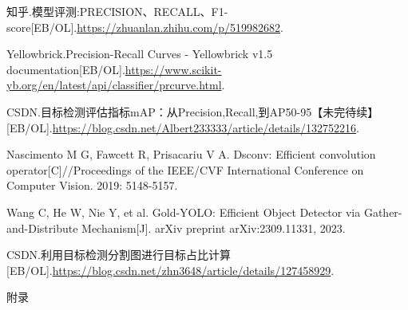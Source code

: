 \documentclass{MathorCupmodeling}
\begin{document}
\begin{spacing}{1.08}
\begin{thebibliography}{99}
	知乎.模型评测:PRECISION、RECALL、F1-score[EB/OL].\url{https://zhuanlan.zhihu.com/p/519982682}.

	Yellowbrick.Precision-Recall Curves - Yellowbrick v1.5 documentation[EB/OL].\url{https://www.scikit-yb.org/en/latest/api/classifier/prcurve.html}.

	CSDN.目标检测评估指标mAP：从Precision,Recall,到AP50-95【未完待续】[EB/OL].\url{https://blog.csdn.net/Albert233333/article/details/132752216}.

	Nascimento M G, Fawcett R, Prisacariu V A. Dsconv: Efficient convolution operator[C]//Proceedings of the IEEE/CVF International Conference on Computer Vision. 2019: 5148-5157.

	Wang C, He W, Nie Y, et al. Gold-YOLO: Efficient Object Detector via Gather-and-Distribute Mechanism[J]. arXiv preprint arXiv:2309.11331, 2023.

	CSDN.利用目标检测分割图进行目标占比计算[EB/OL].\url{https://blog.csdn.net/zhn3648/article/details/127458929}.
	\end{thebibliography}
	\end{spacing}
	\newpage


	\begin{center}
		\heiti{} 附\hspace{2pc}录
	\end{center}

	~\\
\end{document}
